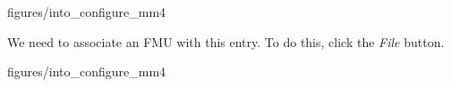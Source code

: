 \documentclass[11pt,a4paper]{../tutorial}
\begin{document}
\begin{instructions}
    \begin{annotation}[width=0.8\linewidth,trim=0 0 0 250,clip]{figures/into_configure_mm4}
    \end{annotation}

\item We need to associate an FMU with this entry. To do this, click the \emph{File} button.

    \begin{annotation}[width=0.8\linewidth,trim=0 0 0 250,clip]{figures/into_configure_mm4}
    \end{annotation}


%
%
%
%
%
%

\end{instructions}
\end{document}
